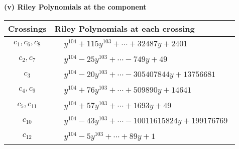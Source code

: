\documentclass[1p]{elsarticle_modified}
\theoremstyle{definition}
\begin{document}
\newpage\renewcommand{\arraystretch}{1}
\flushleft \textbf{(v) Riley Polynomials at the component}\newline \\
\begin{tabular}{m{50pt}|m{274pt}}
Crossings & \hspace{64pt}Riley Polynomials at each crossing \\
\hline $$\begin{aligned}c_{1},c_{6},c_{8}\end{aligned}$$&$\begin{aligned}
&y^{104}+115 y^{103}+\cdots+32487 y+2401
\end{aligned}$\\
\hline $$\begin{aligned}c_{2},c_{7}\end{aligned}$$&$\begin{aligned}
&y^{104}-25 y^{103}+\cdots-749 y+49
\end{aligned}$\\
\hline $$\begin{aligned}c_{3}\end{aligned}$$&$\begin{aligned}
&y^{104}-20 y^{103}+\cdots-305407844 y+13756681
\end{aligned}$\\
\hline $$\begin{aligned}c_{4},c_{9}\end{aligned}$$&$\begin{aligned}
&y^{104}+76 y^{103}+\cdots+509890 y+14641
\end{aligned}$\\
\hline $$\begin{aligned}c_{5},c_{11}\end{aligned}$$&$\begin{aligned}
&y^{104}+57 y^{103}+\cdots+1693 y+49
\end{aligned}$\\
\hline $$\begin{aligned}c_{10}\end{aligned}$$&$\begin{aligned}
&y^{104}-43 y^{103}+\cdots-10011615824 y+199176769
\end{aligned}$\\
\hline $$\begin{aligned}c_{12}\end{aligned}$$&$\begin{aligned}
&y^{104}-5 y^{103}+\cdots+89 y+1
\end{aligned}$\\
\hline
\end{tabular}\\~\\
\end{document}
